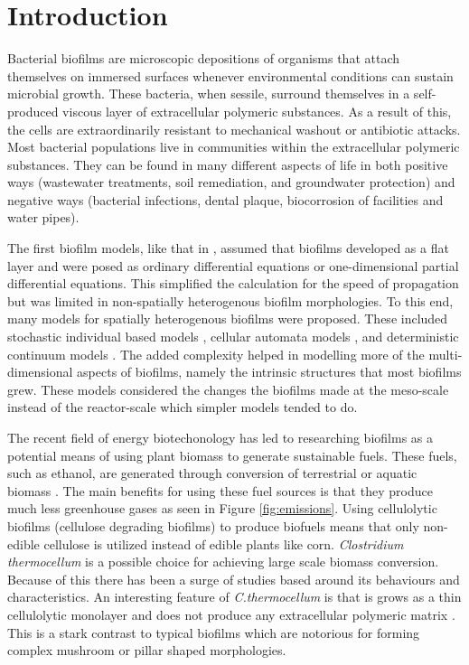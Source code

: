 \section{Introduction}

Bacterial biofilms are microscopic depositions of organisms that attach themselves on immersed surfaces whenever environmental conditions can sustain microbial growth.
These bacteria, when sessile, surround themselves in a self-produced viscous layer of extracellular polymeric substances.
As a result of this, the cells are extraordinarily resistant to mechanical washout or antibiotic attacks.
Most bacterial populations live in communities within the extracellular polymeric substances.
They can be found in many different aspects of life in both positive ways (wastewater treatments, soil remediation, and groundwater protection) and negative ways (bacterial infections, dental plaque, biocorrosion of facilities and water pipes).

The first biofilm models, like that in \cite{rittmann1980model}, assumed that biofilms developed as a flat layer and were posed as ordinary differential equations or one-dimensional partial differential equations.
This simplified the calculation for the speed of propagation but was limited in non-spatially heterogenous biofilm morphologies. %
To this end, many models for spatially heterogenous biofilms were proposed.
These included stochastic individual based models \citep{kreft2001individual}, cellular automata models \citep{picioreanu1998newCombined}, and deterministic continuum models \citep{eberl2001deterministic}. 
The added complexity helped in modelling more of the multi-dimensional aspects of biofilms, namely the intrinsic structures that most biofilms grew.
These models considered the changes the biofilms made at the meso-scale instead of the reactor-scale which simpler models tended to do.

The recent field of energy biotechonology has led to researching biofilms as a potential means of using plant biomass to generate sustainable fuels. 
These fuels, such as ethanol, are generated through conversion of terrestrial or aquatic biomass \citep{lynd2008energy}.
The main benefits for using these fuel sources is that they produce much less greenhouse gases as seen in Figure \ref{fig:emissions}.
Using cellulolytic biofilms (cellulose degrading biofilms) to produce biofuels means that only non-edible cellulose is utilized instead of edible plants like corn.
\textit{Clostridium thermocellum} is a possible choice for achieving large scale biomass conversion. %
Because of this there has been a surge of studies based around its behaviours and characteristics.
An interesting feature of \textit{C.thermocellum} is that is grows as a thin cellulolytic monolayer and does not produce any extracellular polymeric matrix \citep{dumitrache2013formFunction}.
This is a stark contrast to typical biofilms which are notorious for forming complex mushroom or pillar shaped morphologies.

